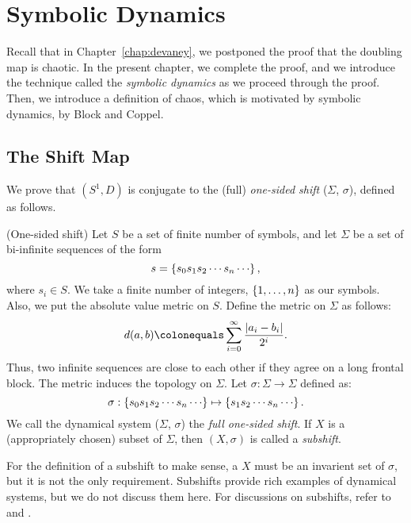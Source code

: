 \documentclass[10pt,twoside]{book}
\begin{document}
\chapter{Symbolic Dynamics}
\label{chap:symbolic}
Recall that in Chapter~\ref{chap:devaney}, we postponed the proof that the doubling map is chaotic.
In the present chapter, we complete the proof, and we introduce the technique called the \textit{symbolic dynamics} as we proceed through the proof.
Then, we introduce a definition of chaos, which is motivated by symbolic dynamics, by Block and Coppel.

\section{The Shift Map}
We prove that $(S^1, D)$ is conjugate to the (full) \textit{one-sided shift} ($\Sigma$, $\sigma$), defined as follows.

\begin{definition}
  (One-sided shift)
  Let $S$ be a set of finite number of symbols, and let $\Sigma$ be a set of bi-infinite sequences of the form
  \begin{equation*}
    s = \set{ s_0 s_1 s_2 \cdots s_n \cdots },
  \end{equation*}
  where $s_i \in S$.
  We take a finite number of integers, $\left \{ 1, \ldots, n \right \}$ as our symbols.
  Also, we put the absolute value metric on $S$.
  Define the metric on $\Sigma$ as follows:
  \begin{equation*}
    d(a,b) \ceq \sum\limits_{i = 0}^{\infty} \frac{\abs{a_i - b_i}}{2^i}.
  \end{equation*}
  Thus, two infinite sequences are close to each other if they agree on a long frontal block.
  The metric induces the topology on $\Sigma$.
  Let $\sigma: \Sigma \to \Sigma$ defined as:
  \begin{equation*}
    \sigma: \set{ s_0 s_1 s_2 \cdots s_n \cdots } 
    \mapsto 
    \set{ s_1 s_2 \cdots s_n \cdots }.
  \end{equation*}
  We call the dynamical system ($\Sigma$, $\sigma$) the \textit{full one-sided shift}.
  If $X$ is a (appropriately chosen) subset of $\Sigma$, then $(X, \sigma)$ is called a \textit{subshift}.
\end{definition}
For the definition of a subshift to make sense, a $X$ must be an invarient set of $\sigma$, but it is not the only requirement.
Subshifts provide rich examples of dynamical systems, but we do not discuss them here.
For discussions on subshifts, refer to \citet{kitchens} and \citet{lind}.
\end{document}
